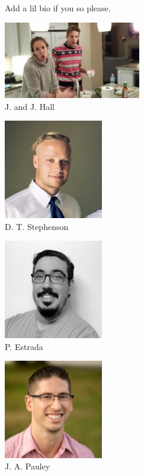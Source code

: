 \vspace{-0.9in}
Add a lil bio if you so please.
\vspace{0.25in}
\begin{multicols}{2}
    \begin{center}
    \includegraphics[width=0.45\textwidth]{Pictures/j&j_mawf_about_authors.jpeg}\\
    J. and J. Hall
\end{center}
\vspace{-0.15in}
\begin{center}
    \includegraphics[width=0.325\textwidth]{Pictures/Dan_bio_pic.jpeg}\\
    D. T. Stephenson
\end{center}
\vspace{-0.15in}
\begin{center}
    \includegraphics[width=0.325\textwidth]{Pictures/pedro_bio.png}\\
    P. Estrada
\end{center}
\vspace{-0.15in}
\begin{center}
    \includegraphics[width=0.325\textwidth]{Pictures/jake_bio_pic.jpeg}\\
    J. A. Pauley
\end{center}
\end{multicols}
